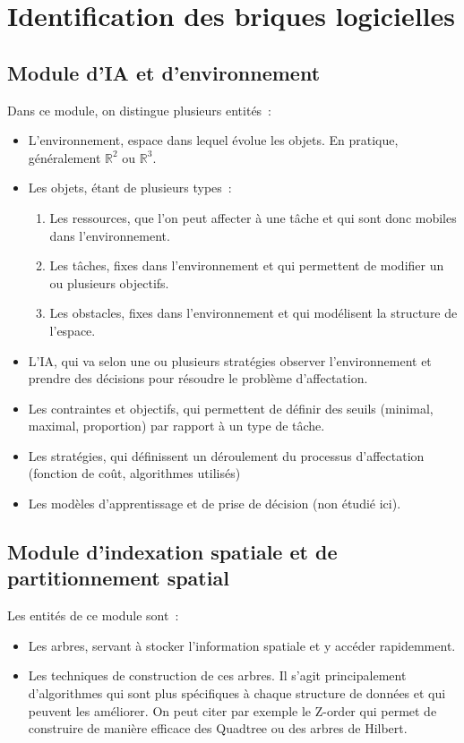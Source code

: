 \section{Identification des briques logicielles}

%
\subsection{Module d'IA et d'environnement}

Dans ce module, on distingue plusieurs entités~:
\renewcommand{\labelitemi}{$\bullet$}
\begin{itemize}
\setlength{\itemsep}{5pt}
\item L'environnement, espace dans lequel évolue les objets. En pratique, généralement $\mathbb{R}^2$ ou $\mathbb{R}^3$.
\item Les objets, étant de plusieurs types~:
	\begin{enumerate}
	\item Les ressources, que l'on peut affecter à une tâche et qui sont donc mobiles dans l'environnement.
	\item Les tâches, fixes dans l'environnement et qui permettent de modifier un ou plusieurs objectifs.
	\item Les obstacles, fixes dans l'environnement et qui modélisent la structure de l'espace.
	\end{enumerate}
\item L'IA, qui va selon une ou plusieurs stratégies observer l'environnement et prendre des décisions pour résoudre le problème d'affectation.
\item Les contraintes et objectifs, qui permettent de définir des seuils (minimal, maximal, proportion) par rapport à un type de tâche.
\item Les stratégies, qui définissent un déroulement du processus d'affectation (fonction de coût, algorithmes utilisés)
\item Les modèles d'apprentissage et de prise de décision (non étudié ici).
\end{itemize} %

%
\subsection{Module d'indexation spatiale et de partitionnement spatial}

Les entités de ce module sont~:
\begin{itemize}
\setlength{\itemsep}{5pt}
\item Les arbres, servant à stocker l'information spatiale et y accéder rapidemment.
\item Les techniques de construction de ces arbres. Il s'agit principalement d'algorithmes qui sont plus spécifiques à chaque structure de données et qui peuvent les améliorer. On peut citer par exemple le Z-order qui permet de construire de manière efficace des Quadtree ou des arbres de Hilbert.
\end{itemize}

